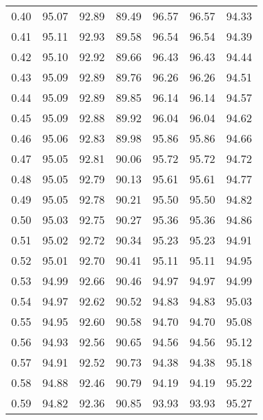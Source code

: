 \begin{tabular}{|c|c|c|c|c|c|c|}
      0.40 &     95.07 &     92.89 &      89.49 &   96.57 &      96.57 &         94.33 \\
      0.41 &     95.11 &     92.93 &      89.58 &   96.54 &      96.54 &         94.39 \\
      0.42 &     95.10 &     92.92 &      89.66 &   96.43 &      96.43 &         94.44 \\
      0.43 &     95.09 &     92.89 &      89.76 &   96.26 &      96.26 &         94.51 \\
      0.44 &     95.09 &     92.89 &      89.85 &   96.14 &      96.14 &         94.57 \\
      0.45 &     95.09 &     92.88 &      89.92 &   96.04 &      96.04 &         94.62 \\
      0.46 &     95.06 &     92.83 &      89.98 &   95.86 &      95.86 &         94.66 \\
      0.47 &     95.05 &     92.81 &      90.06 &   95.72 &      95.72 &         94.72 \\
      0.48 &     95.05 &     92.79 &      90.13 &   95.61 &      95.61 &         94.77 \\
      0.49 &     95.05 &     92.78 &      90.21 &   95.50 &      95.50 &         94.82 \\
      0.50 &     95.03 &     92.75 &      90.27 &   95.36 &      95.36 &         94.86 \\
      0.51 &     95.02 &     92.72 &      90.34 &   95.23 &      95.23 &         94.91 \\
      0.52 &     95.01 &     92.70 &      90.41 &   95.11 &      95.11 &         94.95 \\
      0.53 &     94.99 &     92.66 &      90.46 &   94.97 &      94.97 &         94.99 \\
      0.54 &     94.97 &     92.62 &      90.52 &   94.83 &      94.83 &         95.03 \\
      0.55 &     94.95 &     92.60 &      90.58 &   94.70 &      94.70 &         95.08 \\
      0.56 &     94.93 &     92.56 &      90.65 &   94.56 &      94.56 &         95.12 \\
      0.57 &     94.91 &     92.52 &      90.73 &   94.38 &      94.38 &         95.18 \\
      0.58 &     94.88 &     92.46 &      90.79 &   94.19 &      94.19 &         95.22 \\
      0.59 &     94.82 &     92.36 &      90.85 &   93.93 &      93.93 &         95.27 \\

\end{tabular}
